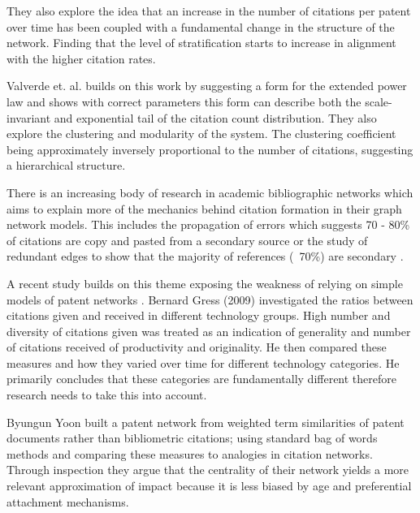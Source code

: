 \documentclass[12pt,journal,compsoc]{IEEEtran}
\begin{document}
They also explore the idea that an increase in the number of citations per patent over time has been coupled with a fundamental change in the structure of the network. Finding that the level of stratification starts to increase in alignment with the higher citation rates. 

Valverde et. al. \cite{valverde2007topology} builds on this work by suggesting a form for the extended power law and shows with correct parameters this form can describe both the scale-invariant and exponential tail of the citation count distribution. They also explore the clustering and modularity of the system. The clustering coefficient being approximately inversely proportional to the number of citations, suggesting a hierarchical structure. 

There is an increasing body of research in academic bibliographic networks which aims to explain more of the mechanics behind citation formation in their graph network models. This includes the propagation of errors which suggests 70 - 80\% of citations are copy and pasted from a secondary source \cite{simkin2005stochastic} or the study of redundant edges to show that the majority of references (~70\%) are secondary \cite{clough2015transitive}.

A recent study builds on this theme exposing the weakness of relying on simple models of patent networks \cite{gress2010properties}. Bernard Gress (2009) investigated the ratios between citations given and received in different technology groups. High number and diversity of citations given was treated as an indication of generality and number of citations received of productivity and originality. He then compared these measures and how they varied over time for different technology categories. He primarily concludes that these categories are fundamentally different therefore research needs to take this into account. 

Byungun Yoon \cite{yoon2004text} built a patent network from weighted term similarities of patent documents rather than bibliometric citations; using standard bag of words methods and comparing these measures to analogies in citation networks. Through inspection they argue that the centrality of their network yields a more relevant approximation of impact because it is less biased by age and preferential attachment mechanisms. 
\end{document}
